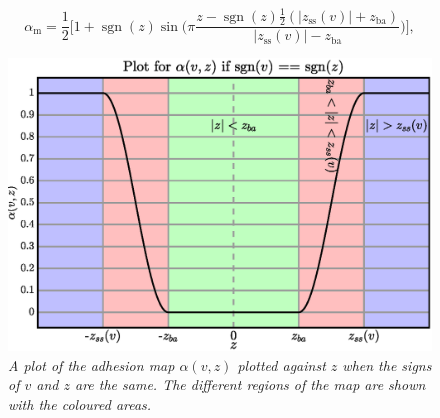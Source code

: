 \documentclass[twoside,a4paper]{article}
\DeclareMathOperator{\sgn}{sgn}
\begin{document}
\begin{equation}
    \alpha_\text{m} = \frac{1}{2}\bigg[1+\sgn(z)\sin\bigg(\pi\frac{z-\sgn(z)\frac{1}{2}(|z_\text{ss}(v)|+z_\text{ba})}{|z_\text{ss}(v)|-z_\text{ba}}\bigg)\bigg],
\end{equation}

\begin{figure}[ht]
\centerline{\includegraphics[width=1.0\columnwidth]{alphaPlot.eps}}
\caption{\label{fig:alphaPlot}{\it A plot of the adhesion map $\alpha(v,z)$ plotted against $z$ when the signs of $v$ and $z$ are the same. The different regions of the map are shown with the coloured areas.}}
\end{figure}
\end{document}
